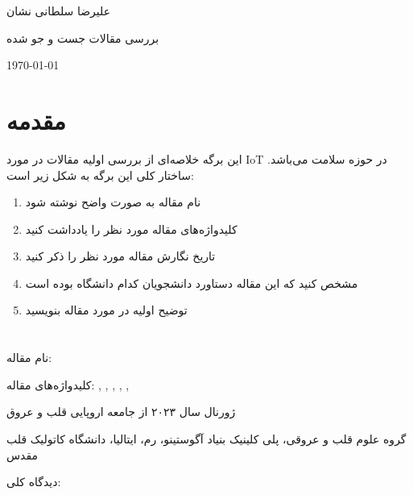 \documentclass[10pt, a4paper]{article}
\begin{document}
\centerline{علیرضا سلطانی نشان}
\centerline{بررسی مقالات جست و جو شده}
\centerline{\today}
\tableofcontents

\section{مقدمه}

این برگه خلاصه‌ای از بررسی اولیه مقالات در مورد IoT در حوزه سلامت می‌باشد.
ساختار کلی این برگه به شکل زیر است:

\begin{enumerate}
    \item نام مقاله به صورت واضح نوشته شود
    \item کلیدواژه‌های مقاله مورد نظر را یادداشت کنید
    \item تاریخ نگارش مقاله مورد نظر را ذکر کنید
    \item مشخص کنید که این مقاله دستاورد دانشجویان کدام دانشگاه بوده است
    \item توضیح اولیه در مورد مقاله بنویسید
\end{enumerate}

\newpage

\section{}

نام مقاله: 

کلیدواژه‌های مقاله: 
,
,
,
,
,

ژورنال سال ۲۰۲۳ از جامعه اروپایی قلب و عروق

گروه علوم قلب و عروقی، پلی کلینیک بنیاد آگوستینو، رم، ایتالیا، دانشگاه کاتولیک
قلب مقدس

دیدگاه کلی:
\end{document}
